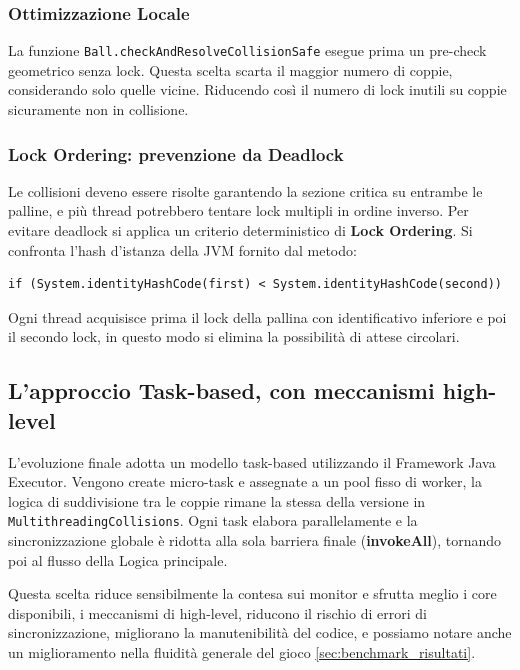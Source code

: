 \subsubsection{Ottimizzazione Locale}
La funzione \texttt{Ball.checkAndResolveCollisionSafe} esegue prima un pre-check geometrico senza lock. Questa scelta scarta il maggior numero di coppie, considerando solo quelle vicine. Riducendo così il numero di lock inutili su coppie sicuramente non in collisione.

\subsubsection{Lock Ordering: prevenzione da Deadlock}
Le collisioni deveno essere risolte garantendo la sezione critica su entrambe le palline, e più thread potrebbero tentare lock multipli in ordine inverso. Per evitare deadlock si applica un criterio deterministico di \textbf{Lock Ordering}.
Si confronta l'hash d'istanza della JVM fornito dal metodo:
\begin{verbatim}
if (System.identityHashCode(first) < System.identityHashCode(second))
\end{verbatim}
Ogni thread acquisisce prima il lock della pallina con identificativo inferiore e poi il secondo lock, in questo modo si elimina la possibilità di attese circolari.

\subsection{L'approccio Task-based, con meccanismi high-level}
L'evoluzione finale adotta un modello task-based utilizzando il Framework Java Executor. Vengono create micro-task e assegnate a un pool fisso di worker, la logica di suddivisione tra le coppie rimane la stessa della versione in \texttt{MultithreadingCollisions}. Ogni task elabora parallelamente e la sincronizzazione globale è ridotta alla sola barriera finale (\textbf{invokeAll}), tornando poi al flusso della Logica principale.

Questa scelta riduce sensibilmente la contesa sui monitor e sfrutta meglio i core disponibili, i meccanismi di high-level, riducono il rischio di errori di sincronizzazione, migliorano la manutenibilità del codice, e possiamo notare anche un miglioramento nella fluidità generale del gioco \ref{sec:benchmark_risultati}.
